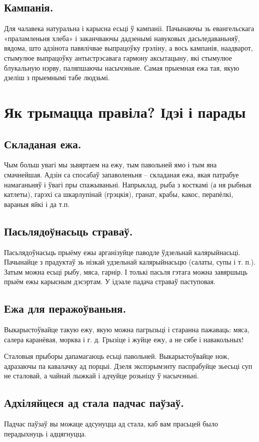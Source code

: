 \subsection{Кампанія.}
Для чалавека натуральна і карысна есьці ў кампаніі. Пачынаючы зь евангельскага «праламленьня хлеба» і заканчваючы дадзенымі навуковых дасьледаваньняў, вядома, што адзінота павялічвае выпрацоўку грэліну, а вось кампанія, наадварот, стымулюе выпрацоўку антыстрэсавага гармону аксытацыну, які стымулюе блукальную нэрву, паляпшаючы насычэньне. Самая прыемная ежа тая, якую дзеліш з прыемнымі табе людзьмі.

\section{Як трымацца правіла? Ідэі і парады}

\subsection{Складаная ежа.}
Чым больш увагі мы зьвяртаем на ежу, тым павольней ямо і тым яна смачнейшая. Адзін са спосабаў запаволеньня – складаная ежа, якая патрабуе намаганьняў і ўвагі пры спажываньні. Напрыклад, рыба з косткамі (а ня рыбныя катлеты), гарэхі са шкарлупінай (грэцкія), гранат, крабы, какос, перапёлкі, вараныя яйкі і да т.п.

\subsection{Пасьлядоўнасьць страваў.}
Пасьлядоўнасьць прыёму ежы арганізуйце паводле ўдзельнай калярыйнасьці. Пачынайце з прадуктаў зь нізкай удзельнай калярыйнасьцю (салаты, супы і т. п.). Затым можна есьці рыбу, мяса, гарнір. І толькі пасьля гэтага можна завяршыць прыём ежы карысным дэсэртам. У ідэале падача страваў паступовая.

\subsection{Ежа для перажоўваньня.}
Выкарыстоўвайце такую ежу, якую можна пагрызьці і старанна пажаваць: мяса, салера каранёвая, морква і г. д. Грызіце і жуйце ежу, а не сябе і навакольных!

Сталовыя прыборы дапамагаюць есьці павольней. Выкарыстоўвайце нож, адразаючы па кавалачку ад порцыі. Дзеля экспэрымэнту паспрабуйце зьесьці суп не сталовай, а чайнай лыжкай і адчуйце розьніцу ў насычэньні.

\subsection{Адхіляйцеся ад стала падчас паўзаў.}
Падчас паўзаў вы можаце адсунуцца ад стала, каб вам прасьцей было перадыхнуць і адцягнуцца.

